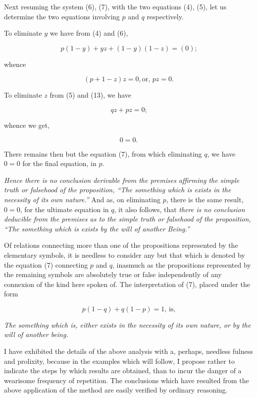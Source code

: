 \documentclass[oneside]{book}
\begin{document}
Next resuming the system (6), (7), with the two equations
(4), (5), let us determine the two equations involving $p$ and $q$
respectively.

To eliminate $y$ we have from (4) and (6),

\[
p(1-y) + yz + (1-y)(1-z) = (0)\textrm{;}
\]

whence

\begin{equation}
(p + 1 - z) z = 0, \textrm{or, } pz = 0\textrm{.}
\end{equation}

To eliminate $z$ from (5) and (13), we have

\[
qz + pz = 0\textrm{;}
\]

whence we get,

\[
0=0\textrm{.}
\]

There remains then but the equation (7), from which eliminating
$q$, we have $0=0$ for the final equation, in $p$.

\textit{Hence there is no conclusion derivable from the premises affirming
the simple truth or falsehood of the proposition, ``The
something which is exists in the necessity of its own nature.''} And as,
on eliminating $p$, there is the same result, $0=0$, for the ultimate
equation in $q$, it also follows, that \textit{there is no conclusion deducible
from the premises as to the simple truth or falsehood of the proposition,
``The something which is exists by the will of another Being.''}

Of relations connecting more than one of the propositions
represented by the elementary symbols, it is needless to consider
any but that which is denoted by the equation (7) connecting
$p$ and $q$, inasmuch as the propositions represented by the
remaining symbols are absolutely true or false independently of any
connexion of the kind here spoken of. The interpretation of (7),
placed under the form

\[
p(1-q) + q(1-p) = 1\textrm{, is,}
\]

\textit{The something which is, either exists in the necessity of its
own nature, or by the will of another being.}

I have exhibited the details of the above analysis with a,
perhaps, needless fulness and prolixity, because in the examples
which will follow, I propose rather to indicate the steps by
which results are obtained, than to incur the danger of a
wearisome frequency of repetition. The conclusions which have
resulted from the above application of the method are easily verified
by ordinary reasoning.
\end{document}
